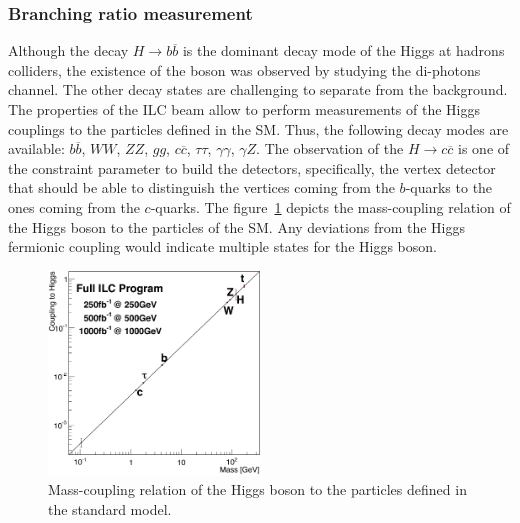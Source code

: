     \subsubsection{Branching ratio measurement}

    Although the decay $H \rightarrow b\overline{b}$ is the dominant decay mode of the Higgs at hadrons colliders, the existence of the boson was observed by studying the di-photons channel.
    The other decay states are challenging to separate from the background.
    The properties of the \gls{ILC} beam allow to perform measurements of the Higgs couplings to the particles defined in the \gls{SM}.
    Thus, the following decay modes are available: $b\overline{b}$, $WW$, $ZZ$, $gg$, $c\overline{c}$, $\tau \tau$, $\gamma \gamma$, $\gamma Z$.
    The observation of the $H \rightarrow c\overline{c}$ is one of the constraint parameter to build the detectors, specifically, the vertex detector that should be able to distinguish the vertices coming from the $b$-quarks to the ones coming from the $c$-quarks.
    The figure~\ref{fig:coupling} depicts the mass-coupling relation of the Higgs boson to the particles of the \gls{SM}.
    Any deviations from the Higgs fermionic coupling would indicate multiple states for the Higgs boson.

    \begin{figure}[!h]
      \centering
      \includegraphics[width = 0.5\textwidth]{Pictures/Higgs/Chapter_Theory_figs_mass-coupling1TeV.png}
      \caption{Mass-coupling relation of the Higgs boson to the particles defined in the standard model\cite{tian}.}
      \label{fig:coupling}
    \end{figure}


